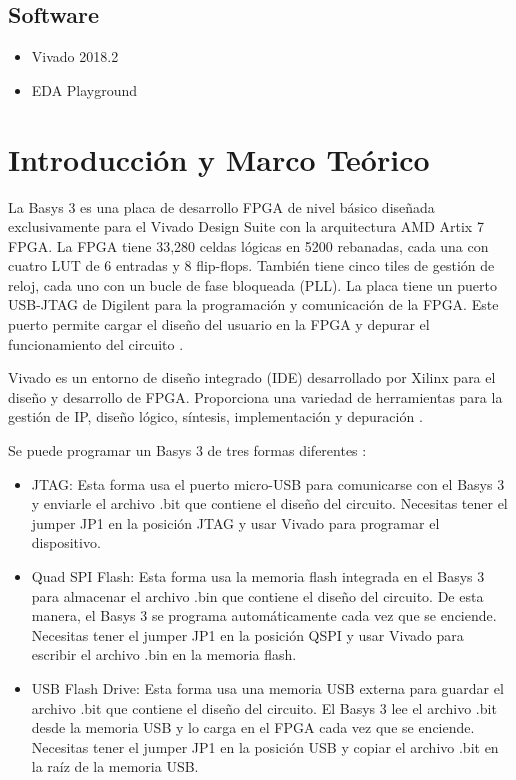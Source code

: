 \documentclass[12pt]{article}  %
\begin{document}
\subsection*{Software}

\begin{itemize}
    \item Vivado 2018.2
    \item EDA Playground
\end{itemize}

\section*{Introducción y Marco Teórico}
La Basys 3 es una placa de desarrollo FPGA de nivel básico diseñada exclusivamente para el Vivado Design Suite con la arquitectura AMD Artix 7 FPGA. La FPGA tiene 33,280 celdas lógicas en 5200 rebanadas, cada una con cuatro LUT de 6 entradas y 8 flip-flops. También tiene cinco tiles de gestión de reloj, cada uno con un bucle de fase bloqueada (PLL). La placa tiene un puerto USB-JTAG de Digilent para la programación y comunicación de la FPGA. Este puerto permite cargar el diseño del usuario en la FPGA y depurar el funcionamiento del circuito \cite{Digilent2023}.

Vivado es un entorno de diseño integrado (IDE) desarrollado por Xilinx para el diseño y desarrollo de FPGA. Proporciona una variedad de herramientas para la gestión de IP, diseño lógico, síntesis, implementación y depuración \cite{AMDVivado2023}.

Se puede programar un Basys 3 de tres formas diferentes \cite{Digilent2023Guide}:
\begin{itemize}
  \item JTAG: Esta forma usa el puerto micro-USB para comunicarse con el Basys 3 y enviarle el archivo .bit que contiene el diseño del circuito. Necesitas tener el jumper JP1 en la posición JTAG y usar Vivado para programar el dispositivo.
  \item Quad SPI Flash: Esta forma usa la memoria flash integrada en el Basys 3 para almacenar el archivo .bin que contiene el diseño del circuito. De esta manera, el Basys 3 se programa automáticamente cada vez que se enciende. Necesitas tener el jumper JP1 en la posición QSPI y usar Vivado para escribir el archivo .bin en la memoria flash.
  \item USB Flash Drive: Esta forma usa una memoria USB externa para guardar el archivo .bit que contiene el diseño del circuito. El Basys 3 lee el archivo .bit desde la memoria USB y lo carga en el FPGA cada vez que se enciende. Necesitas tener el jumper JP1 en la posición USB y copiar el archivo .bit en la raíz de la memoria USB.
\end{itemize}
\end{document}
